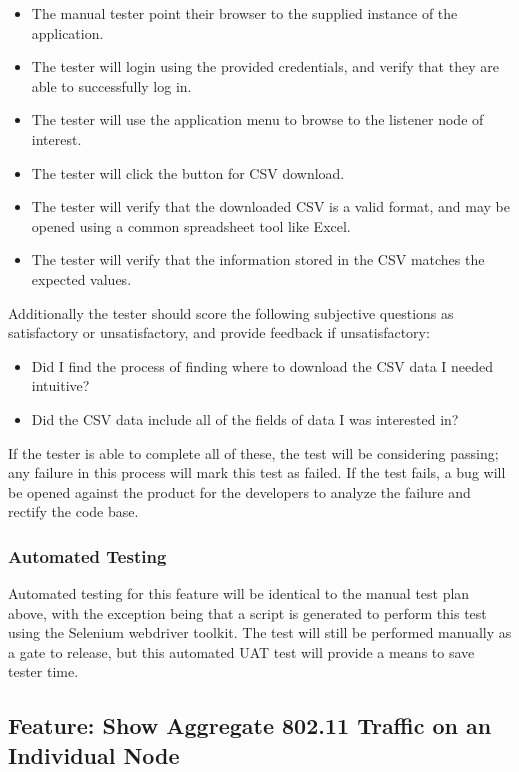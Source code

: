 \documentclass[]{article}
\begin{document}
	\begin{itemize}
	    \item The manual tester point their browser to the supplied instance of the application.
	    \item The tester will login using the provided credentials, and verify that they are able to successfully log in.
	    \item The tester will use the application menu to browse to the listener node of interest.
	    \item The tester will click the button for CSV download.
	    \item The tester will verify that the downloaded CSV is a valid format, and may be opened using a common spreadsheet tool like Excel.
	    \item The tester will verify that the information stored in the CSV matches the expected values.
	\end{itemize}
	
	Additionally the tester should score the following subjective questions as satisfactory or unsatisfactory,
	and provide feedback if unsatisfactory:
	
	\begin{itemize}
	   \item Did I find the process of finding where to download the CSV data I needed intuitive?
	   \item Did the CSV data include all of the fields of data I was interested in?
	\end{itemize}

    If the tester is able to complete all of these, the test will be considering passing; any failure in this process will
    mark this test as failed. If the test fails, a bug will be opened against the product for the developers to analyze the
    failure and rectify the code base.
	
	\subsubsection{Automated Testing}

    Automated testing for this feature will be identical to the manual test plan above, with the exception being that
    a script is generated to perform this test using the Selenium webdriver toolkit.	The test will still be performed
    manually as a gate to release, but this automated UAT test will provide a means to save tester time.
	
	\subsection{Feature: Show Aggregate 802.11 Traffic on an Individual Node}
\end{document}
